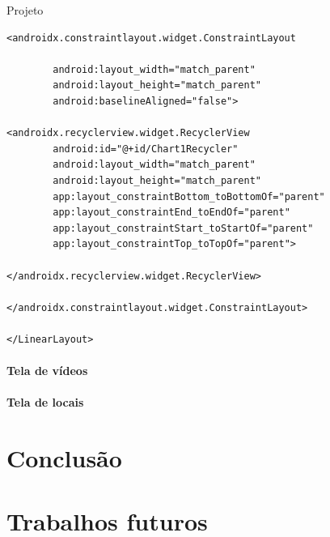 \documentclass[
	12pt,				%
	openright,			%
	twoside,			%
	a4paper,			%
	english,			%
	french,				%
	spanish,			%
	brazil				%
	]{abntex2}
\begin{document}
\begin{chapter}{Projeto}
\begin{lstlisting}[numbers=none,basicstyle=\small,
caption={FragmentStatistics.xml},
title={FragmentStatistics.xml},
label={FragmentStatistics.xml}]
<androidx.constraintlayout.widget.ConstraintLayout

		android:layout_width="match_parent"
		android:layout_height="match_parent"
		android:baselineAligned="false">

<androidx.recyclerview.widget.RecyclerView
		android:id="@+id/Chart1Recycler"
		android:layout_width="match_parent"
		android:layout_height="match_parent"
		app:layout_constraintBottom_toBottomOf="parent"
		app:layout_constraintEnd_toEndOf="parent"
		app:layout_constraintStart_toStartOf="parent"
		app:layout_constraintTop_toTopOf="parent">

</androidx.recyclerview.widget.RecyclerView>

</androidx.constraintlayout.widget.ConstraintLayout>

</LinearLayout>

\end{lstlisting}
\subsubsection{Tela de vídeos}
\subsubsection{Tela de locais}
\end{chapter}

\chapter{Conclusão}

\chapter{Trabalhos futuros}



\postextual




\end{document}
